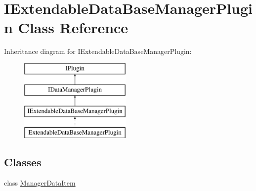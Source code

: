 \hypertarget{class_i_extendable_data_base_manager_plugin}{}\section{I\+Extendable\+Data\+Base\+Manager\+Plugin Class Reference}
\label{class_i_extendable_data_base_manager_plugin}
Inheritance diagram for I\+Extendable\+Data\+Base\+Manager\+Plugin\+:\begin{figure}[H]
\begin{center}
\leavevmode
\includegraphics[height=4.000000cm]{class_i_extendable_data_base_manager_plugin}
\end{center}
\end{figure}
\subsection*{Classes}
\begin{DoxyCompactItemize}
\item 
class \hyperlink{class_i_extendable_data_base_manager_plugin_1_1_manager_data_item}{Manager\+Data\+Item}
\end{DoxyCompactItemize}
